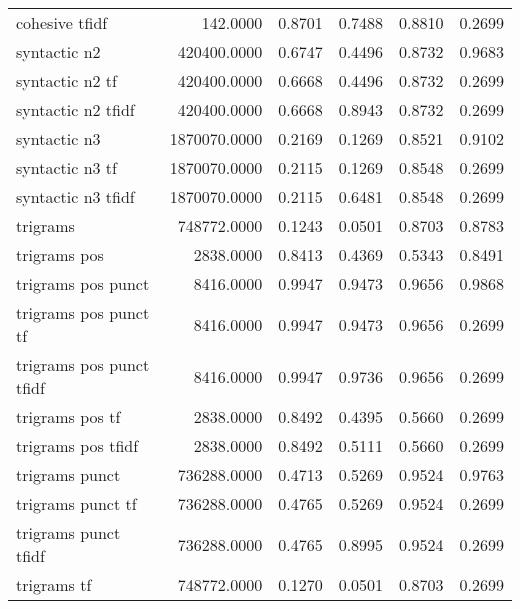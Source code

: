 \begin{tabular}{lrrrrr}
cohesive tfidf             &     142.0000 & 0.8701 &       0.7488 &         0.8810 &               0.2699 \\
syntactic n2               &  420400.0000 & 0.6747 &       0.4496 &         0.8732 &               0.9683 \\
syntactic n2 tf            &  420400.0000 & 0.6668 &       0.4496 &         0.8732 &               0.2699 \\
syntactic n2 tfidf         &  420400.0000 & 0.6668 &       0.8943 &         0.8732 &               0.2699 \\
syntactic n3               & 1870070.0000 & 0.2169 &       0.1269 &         0.8521 &               0.9102 \\
syntactic n3 tf            & 1870070.0000 & 0.2115 &       0.1269 &         0.8548 &               0.2699 \\
syntactic n3 tfidf         & 1870070.0000 & 0.2115 &       0.6481 &         0.8548 &               0.2699 \\
trigrams                   &  748772.0000 & 0.1243 &       0.0501 &         0.8703 &               0.8783 \\
trigrams pos               &    2838.0000 & 0.8413 &       0.4369 &         0.5343 &               0.8491 \\
trigrams pos punct         &    8416.0000 & 0.9947 &       0.9473 &         0.9656 &               0.9868 \\
trigrams pos punct tf      &    8416.0000 & 0.9947 &       0.9473 &         0.9656 &               0.2699 \\
trigrams pos punct tfidf   &    8416.0000 & 0.9947 &       0.9736 &         0.9656 &               0.2699 \\
trigrams pos tf            &    2838.0000 & 0.8492 &       0.4395 &         0.5660 &               0.2699 \\
trigrams pos tfidf         &    2838.0000 & 0.8492 &       0.5111 &         0.5660 &               0.2699 \\
trigrams punct             &  736288.0000 & 0.4713 &       0.5269 &         0.9524 &               0.9763 \\
trigrams punct tf          &  736288.0000 & 0.4765 &       0.5269 &         0.9524 &               0.2699 \\
trigrams punct tfidf       &  736288.0000 & 0.4765 &       0.8995 &         0.9524 &               0.2699 \\
trigrams tf                &  748772.0000 & 0.1270 &       0.0501 &         0.8703 &               0.2699 \\

\end{tabular}
